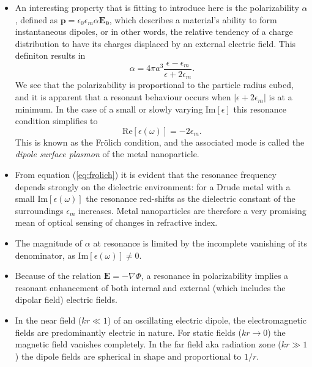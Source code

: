 \begin{itemize}
    \item An interesting property that is fitting to introduce here is the polarizability $\alpha$, defined as $\mathbf{p} = \epsilon_0\epsilon_m\alpha\mathbf{E_0}$, which describes a material's ability to form instantaneous dipoles, or in other words, the relative tendency of a charge distribution to have its charges displaced by an external electric field. This definiton results in 
    \begin{equation}
        \alpha = 4\pi a^3 \frac{\epsilon-\epsilon_m}{\epsilon+2\epsilon_m}.
    \end{equation}
    We see that the polarizability is proportional to the particle radius cubed, and it is apparent that a resonant behaviour occurs when $|\epsilon+2\epsilon_m|$ is at a minimum. In the case of a small or slowly varying Im$[\epsilon]$ this resonance condition simplifies to 
    \begin{equation}
        \text{Re}[\epsilon(\omega)] = -2\epsilon_m.
        \label{eq:frolich}
    \end{equation}
    This is known as the Frölich condition, and the associated mode is called the \emph{dipole surface plasmon} of the metal nanoparticle.
    
    \item From equation (\ref{eq:frolich}) it is evident that the resonance frequency depends strongly on the dielectric environment: for a Drude metal with a small Im$[\epsilon(\omega)]$ the resonance red-shifts as the dielectric constant of the surroundings $\epsilon_m$ increases. Metal nanoparticles are therefore a very promising mean of optical sensing of changes in refractive index.
    
    \item The magnitude of $\alpha$ at resonance is limited by the incomplete vanishing of its denominator, as Im$[\epsilon(\omega)] \neq 0$.
    
    \item Because of the relation $\mathbf{E} = -\nabla \Phi$, a resonance in polarizability implies a resonant enhancement of both internal and external (which includes the dipolar field) electric fields.
    
    \item In the near field ($kr \ll 1$) of an oscillating electric dipole, the electromagnetic fields are predominantly electric in nature. For static fields ($kr \to 0$) the magnetic field vanishes completely. In the far field aka radiation zone ($kr \gg 1$) the dipole fields are spherical in shape and proportional to $1/r$.
    

\end{itemize}
